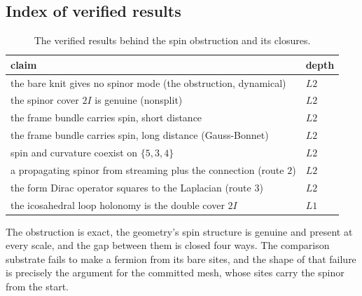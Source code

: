 \subsection{Index of verified results}

\begin{table}[ht]
\centering
\begin{tabular}{@{}p{}p{}@{}}
\toprule
claim & depth \\
\midrule
the bare knit gives no spinor mode (the obstruction, dynamical) & $L2$ \\
the spinor cover $2I$ is genuine (nonsplit) & $L2$ \\
the frame bundle carries spin, short distance & $L2$ \\
the frame bundle carries spin, long distance (Gauss-Bonnet) & $L2$ \\
spin and curvature coexist on $\{5,3,4\}$ & $L2$ \\
a propagating spinor from streaming plus the connection (route $2$) & $L2$ \\
the form Dirac operator squares to the Laplacian (route $3$) & $L2$ \\
the icosahedral loop holonomy is the double cover $2I$ & $L1$ \\
\bottomrule
\end{tabular}
\caption{The verified results behind the spin obstruction and its closures.}
\label{tab:534-verified}
\end{table}

The obstruction is exact, the geometry's spin structure is genuine and present at every scale, and the gap
between them is closed four ways. The comparison substrate fails to make a fermion from its bare sites, and the
shape of that failure is precisely the argument for the committed mesh, whose sites carry the spinor from the
start.

